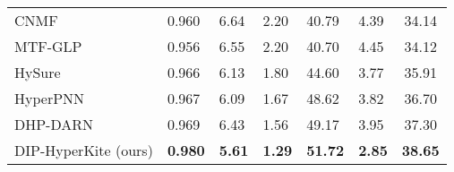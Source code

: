 \documentclass[journal]{IEEEtran}
\begin{document}
\begin{table}[tb]
\begin{tabular}{lp{0.5cm}p{0.5cm}p{0.6cm}p{0.5cm}p{0.6cm}c}
        CNMF \cite{CNMF}                & 0.960            & 6.64            & 2.20            & 40.79           & 4.39            & 34.14\\
        MTF-GLP \cite{MTF-GLP}          & 0.956            & 6.55            & 2.20            & 40.70           & 4.45           & 34.12\\
        HySure \cite{hysure}            & 0.966            & 6.13            & 1.80            & 44.60           & 3.77            & 35.91\\
        HyperPNN \cite{Hyper-PNN}       & 0.967            & 6.09            & 1.67            & 48.62           & 3.82            & 36.70\\
        DHP-DARN \cite{DHP-DARN}        & 0.969            & 6.43            & 1.56            & 49.17           & 3.95            & 37.30\\
        DIP-HyperKite (ours)            & \textbf{0.980}   & \textbf{5.61}   & \textbf{1.29}   & \textbf{51.72}  & \textbf{2.85}   & \textbf{38.65}\\
        \hline
        \end{tabular}
        \label{tab:pavia_final_fuse_quant}
    \end{table}
    
\end{document}
